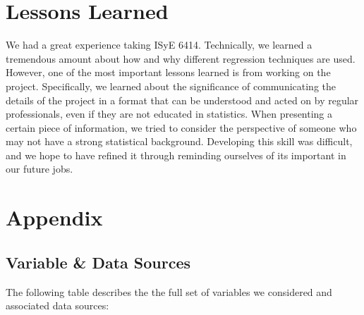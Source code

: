 \documentclass[]{article}
\begin{document}
\section{Lessons Learned}\label{lessons-learned}

We had a great experience taking ISyE 6414. Technically, we learned a
tremendous amount about how and why different regression techniques are
used. However, one of the most important lessons learned is from working
on the project. Specifically, we learned about the significance of
communicating the details of the project in a format that can be
understood and acted on by regular professionals, even if they are not
educated in statistics. When presenting a certain piece of information,
we tried to consider the perspective of someone who may not have a
strong statistical background. Developing this skill was difficult, and
we hope to have refined it through reminding ourselves of its important
in our future jobs.

\newpage 

\section{Appendix}\label{appendix}

\subsection{Variable \& Data Sources}\label{variable-data-sources}

The following table describes the the full set of variables we
considered and associated data sources:
\end{document}
